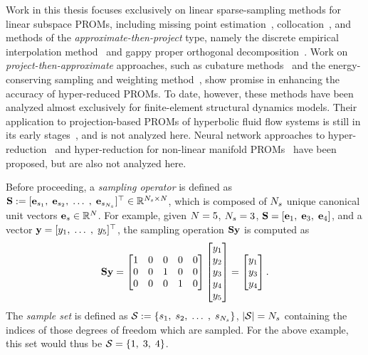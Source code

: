 Work in this thesis focuses exclusively on linear sparse-sampling methods for linear subspace PROMs, including missing point estimation~\cite{Astrid2004}, collocation~\cite{Bos2004}, and methods of the \textit{approximate-then-project} type, namely the discrete empirical interpolation method~\cite{Chaturantabut2010} and gappy proper orthogonal decomposition~\cite{Everson1995}. Work on \textit{project-then-approximate} approaches, such as cubature methods~\cite{An2008,Hernandez2017} and the energy-conserving sampling and weighting method~\cite{Farhat2014}, show promise in enhancing the accuracy of hyper-reduced PROMs. To date, however, these methods have been analyzed almost exclusively for finite-element structural dynamics models. Their application to projection-based PROMs of hyperbolic fluid flow systems is still in its early stages~\cite{Grimberg2020Hyper}, and is not analyzed here. Neural network approaches to hyper-reduction~\cite{nnHyperRed} and hyper-reduction for non-linear manifold PROMs~\cite{Kim2022} have been proposed, but are also not analyzed here.

Before proceeding, a \textit{sampling operator} is defined as $\mathbf{S} := [\mathbf{e}_{s_1}, \; \mathbf{e}_{s_2}, \; \hdots \;, \; \mathbf{e}_{s_{N_s}} ]^\top \in \mathbb{R}^{N_s \times N}$, which is composed of $N_s$ unique canonical unit vectors $\mathbf{e}_{s} \in \mathbb{R}^{N}$. For example, given $N = 5$, $N_s = 3$, $\mathbf{S} = [\mathbf{e}_1, \; \mathbf{e}_3, \; \mathbf{e}_4]$,
and a vector $\mathbf{y} = [y_1, \; \hdots \;, \; y_5]^\top$, the sampling operation $\mathbf{S} \mathbf{y}$ is computed as
%
\begin{equation}
	\mathbf{S} \mathbf{y} =
	\begin{bmatrix}
		1 & 0 & 0 & 0 & 0 \\
		0 & 0 & 1 & 0 & 0 \\
		0 & 0 & 0 & 1 & 0 \\
	\end{bmatrix}
	\begin{bmatrix}
		y_1 \\ y_2 \\ y_3 \\ y_4 \\ y_5
	\end{bmatrix} =
	\begin{bmatrix}
		y_1 \\ y_3 \\ y_4
	\end{bmatrix}.
\end{equation}
%
The \textit{sample set} is defined as $\mathcal{S} := \{s_1, \; s_2, \; \hdots \;, \; s_{N_s}\}$, $| \mathcal{S} | = N_s$ containing the indices of those degrees of freedom which are sampled. For the above example, this set would thus be $\mathcal{S} = \{1, \; 3, \; 4\}$.

